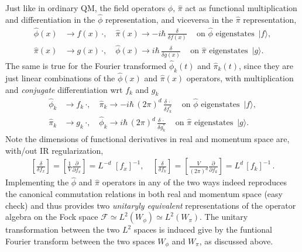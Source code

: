 \documentclass[../QFT_main.tex]{subfiles}
\begin{document}
\begin{mytheorem}
%
Just like in ordinary QM, the field operators $\hat{\phi},\,\hat{\pi}$ act as functional multiplication and differentiation in the $\hat{\phi}$ representation, and viceversa in the $\hat{\pi}$ representation, 
\begin{align}
    \hat{\phi}(x) &\to f(x)\, \cdot, \quad
    \hat{\pi}(x) \to -i \hbar \,\tfrac{\delta}{\delta f(x)}\,\quad \text{on $\hat{\phi}$ eigenstates }\, |f\rangle, \\
    \hat{\pi}(x) &\to g(x)\, \cdot, \quad
    \hat{\phi}(x) \to i \hbar \,\tfrac{\delta}{\delta g(x)}\,\quad \text{on $\hat{\pi}$ eigenstates } \,|g\rangle.
\end{align}
%
The same is true for the Fourier transformed $\hat{\phi}_k(t)$ and $\hat{\pi}_k(t)$, since they are just linear combinations of the $\hat{\phi}(x)$ and $\hat{\pi}(x)$ operators, with multiplication and \emph{conjugate} differentiation wrt $f_k$ and $g_k$
\begin{align}
    \hat{\phi}_k &\to f_k\, \cdot, \quad
    \hat{\pi}_k \to -i \hbar\, (2\pi)^d \,\frac{\delta\,\cdot}{\delta f^*_{k}}\,\quad \text{on $\hat{\phi}$ eigenstates }\, |f\rangle, \\
    \hat{\pi}_k &\to g_k\, \cdot, \quad
    \hat{\phi}_k \to i \hbar\, (2\pi)^d \,\frac{\delta\,\cdot}{\delta g^*_{k}}\,\quad \text{on $\hat{\pi}$ eigenstates } \,|g\rangle.
\end{align}
%
Note the dimensions of functional derivatives in real and momentum space are, with/out IR regularization,
\begin{align}
    \left[\frac{\delta}{\delta f_x}\right]= \left[\frac{1}{V}\frac{\partial}{\partial f_x}\right]= L^{-d}\,\,[f_x]^{-1}, \quad
    \left[\frac{\delta}{\delta f_k}\right]= \left[\frac{V}{(2\pi)^d} \frac{\partial}{\partial f_k}\right]= L^{d}\, [f_k]^{-1}\,.
\end{align}
%
Implementing the $\hat{\phi}$ and $\hat{\pi}$ operators in any of the two ways indeed reproduces the canonical commutation relations in both real and momentum space (easy check) and thus provides two \emph{unitaryly equivalent} representations of the operator algebra on the Fock space $\mathcal{F}\simeq L^2(W_{\phi})\simeq L^2(W_{\pi})$.
The unitary transformation between the two $L^2$ spaces is induced give by the funtional Fourier transform between the two spaces $W_{\phi}$ and $W_{\pi}$, as discussed above.


\end{mytheorem}
\end{document}
